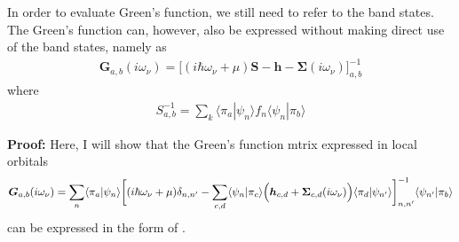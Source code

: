 \documentclass[11pt,a4paper]{report}
\newcommand{\mat}[1]{\bm{#1}}  %
\begin{document}
In order to evaluate Green's function, we still need to refer to the
band states. The Green's function can, however, also be expressed
without making direct use of the band states, namely as
\begin{eqnarray}
\mat{G}_{a,b}(i\omega_\nu)
=\biggl[(i\hbar\omega_\nu+\mu)\mat{S}
-\mat{h}-\mat{\Sigma}(i\omega_\nu)\biggr]^{-1}
_{a,b}
\label{eq:greenlocform1}
\end{eqnarray}
where
\begin{eqnarray}
S^{-1}_{a,b}=\sum_k\langle\pi_a|\psi_n\rangle f_n\langle\psi_n|\pi_b\rangle
\label{eq:inverses}
\end{eqnarray}

\textbf{Proof:}
Here, I will show that the Green's function mtrix expressed in local orbitals
\begin{eqnarray}
\mat{G}_{a,b}(i\omega_\nu)=
\sum_n\langle\pi_a|\psi_n\rangle
\biggl[
(i\hbar\omega_\nu+\mu)\delta_{n,n'}-
\sum_{c,d}\langle\psi_n|\pi_c\rangle
\Bigl(\mat{h}_{c,d}+\mat{\Sigma}_{c,d}(i\omega_\nu)\Bigr)
\langle\pi_d|\psi_{n'}\rangle
\biggr]^{-1}_{n,n'}
\langle\psi_{n'}|\pi_b\rangle
\nonumber\\
\label{eq:greenlocform2}
\end{eqnarray}
can be expressed in the form of .
\end{document}
